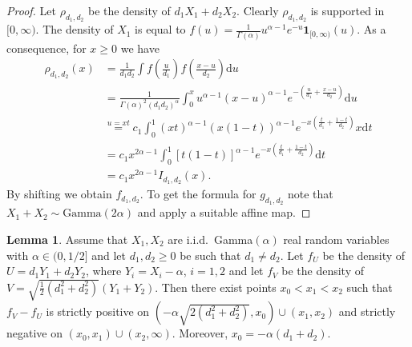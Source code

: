 \documentclass[11pt]{amsart}
\newcommand{\dd}{\mathrm{d}}
\newcommand{\1}{\mathbf{1}}
\theoremstyle{definition}
\newtheorem{lemma}{Lemma}
\theoremstyle{definition}
\theoremstyle{remark}
\begin{document}
\begin{proof}
Let $\rho_{d_1, d_2}$ be the density of $d_1 X_1+ d_2 X_2$. Clearly $\rho_{d_1, d_2}$  is supported in $[0,\infty)$. The density of $X_1$ is equal to $f(u)=\frac{1}{\Gamma(\alpha)}u^{\alpha-1}e^{-u}\1_{[0,\infty)}(u)$. As a consequence, for $x \geq 0$ we have 
\begin{align*}
	\rho_{d_1, d_2}(x) 
	  & = \frac{1}{d_1 d_2}\int f\left( \frac{u}{d_1}\right) f\left( \frac{x-u}{d_2}\right) \dd u \\
	  & = \frac{1}{\Gamma(\alpha)^2 (d_1 d_2)^\alpha} \int_0^x u^{\alpha-1} (x-u)^{\alpha-1} e^{-\left(\frac{u}{d_1}+\frac{x-u}{d_2}\right)} \dd u \\
	  & \overset{u=xt}{=} c_1 \int_0^1 (xt)^{\alpha-1} (x(1-t))^{\alpha-1} e^{-x\left(\frac{t}{d_1}+\frac{1-t}{d_2}\right)} x\dd t \\
	  & = c_1 x^{2\alpha-1} \int_0^1 [t(1-t)]^{\alpha-1} e^{-x\left(\frac{t}{d_1}+\frac{1-t}{d_2}\right)} \dd t \\
	  & = c_1 x^{2\alpha-1}I_{d_1, d_2}(x).
\end{align*}
By shifting we obtain $f_{d_1, d_2}$. To get the formula for $g_{d_1, d_2}$ note that $X_1 + X_2 \sim \text{Gamma}(2\alpha)$ and apply a suitable affine map.
\end{proof}



\begin{lemma}\label{lem:3-times}
Assume that $X_1, X_2$ are i.i.d.\ Gamma$(\alpha)$ real random variables with $\alpha \in (0, 1/2]$  and let $d_1,d_2 \geq 0$ be such that $d_1 \ne d_2$. Let $f_{U}$ be the density of $U=d_1 Y_1 + d_2 Y_2$, where $Y_i=X_i-\alpha$, $i=1,2$ and let $f_{V}$ be the density of $V=\sqrt{\frac12(d_1^2+d_2^2)}( Y_1 + Y_2)$. Then there exist points $x_0<x_1<x_2$ such that $f_{V}-f_{U}$  is strictly positive on $(-\alpha\sqrt{2(d_1^2+d_2^2)}, x_0) \cup(x_1,x_2)$ and strictly negative on $(x_0,x_1) \cup (x_2, \infty)$. Moreover, $x_0=-\alpha(d_1+d_2)$.
\end{lemma}
\end{document}
